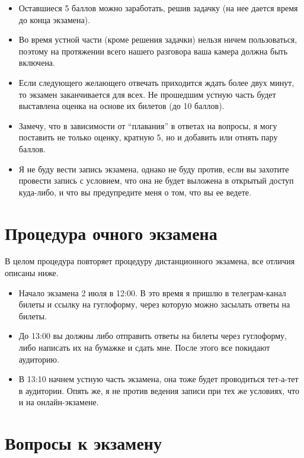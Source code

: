 \documentclass[12pt]{article}
\begin{document}
\begin{itemize}
  \item Оставшиеся 5 баллов можно заработать, решив задачку (на нее дается время до конца экзамена).
  \item Во время устной части (кроме решения задачки) нельзя ничем пользоваться, поэтому на протяжении всего нашего разговора ваша камера должна быть включена.
  \item Если следующего желающего отвечать приходится ждать более двух минут, то экзамен заканчивается для всех. Не прошедшим устную часть будет выставлена оценка на основе их билетов (до 10 баллов).
  \item Замечу, что в зависимости от ``плавания'' в ответах на вопросы, я могу поставить не только оценку, кратную 5, но и добавить или отнять пару баллов. 
  \item Я не буду вести запись экзамена, однако не буду против, если вы захотите провести запись с условием, что она не будет выложена в открытый доступ куда-либо, и что вы предупредите меня о том, что вы ее ведете. 
\end{itemize}


\section*{Процедура очного экзамена}

В целом процедура повторяет процедуру дистанционного экзамена, все отличия описаны ниже.
\begin{itemize}
  \item Начало экзамена 2 июля в 12:00. В это время я пришлю в телеграм-канал билеты и ссылку на гуглоформу, через которую можно засылать ответы на билеты.
  \item До 13:00 вы должны либо отправить ответы на билеты через гуглоформу, либо написать их на бумажке и сдать мне. После этого все покидают аудиторию. 
  \item В 13:10 начнем устную часть экзамена, она тоже будет проводиться тет-а-тет в аудитории. Опять же, я не против ведения записи при тех же условиях, что и на онлайн-экзамене.
\end{itemize}

\newpage

\section*{Вопросы к экзамену}
\end{document}

